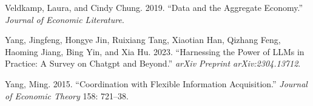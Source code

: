 \documentclass[
]{article}
\newlength{\cslhangindent}
\newenvironment{CSLReferences}[2] %
 {\begin{list}{}{%
  \setlength{\itemindent}{0pt}
  \setlength{\leftmargin}{0pt}
  \setlength{\parsep}{0pt}
  \ifodd #1
   \setlength{\leftmargin}{\cslhangindent}
   \setlength{\itemindent}{-1\cslhangindent}
  \fi
  \setlength{\itemsep}{#2\baselineskip}}}
 {\end{list}}
\theoremstyle{plain}
\theoremstyle{remark}
\begin{document}
\begin{CSLReferences}{1}{0}
Veldkamp, Laura, and Cindy Chung. 2019. {``Data and the Aggregate
Economy.''} \emph{Journal of Economic Literature}.

Yang, Jingfeng, Hongye Jin, Ruixiang Tang, Xiaotian Han, Qizhang Feng,
Haoming Jiang, Bing Yin, and Xia Hu. 2023. {``Harnessing the Power of
LLMs in Practice: A Survey on Chatgpt and Beyond.''} \emph{arXiv
Preprint arXiv:2304.13712}.

Yang, Ming. 2015. {``Coordination with Flexible Information
Acquisition.''} \emph{Journal of Economic Theory} 158: 721--38.

\end{CSLReferences}
\end{document}
